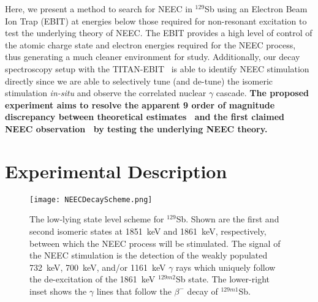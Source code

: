 \documentclass[12pt]{article}
\begin{document}
Here, we present a method to search for NEEC in $^{129}$Sb using an Electron Beam Ion Trap (EBIT) at energies below those required for non-resonant excitation to test the underlying theory of NEEC.  The EBIT provides a high level of control of the atomic charge state and electron energies required for the NEEC process, thus generating a much cleaner environment for study.  Additionally, our decay spectroscopy setup with the TITAN-EBIT~\cite{Lea15} is able to identify NEEC stimulation directly since we are able to selectively tune (and de-tune) the isomeric stimulation {\it in-situ} and observe the correlated nuclear $\gamma$ cascade.  \textbf{The proposed experiment aims to resolve the apparent 9 order of magnitude discrepancy between theoretical estimates~\cite{Pal19} and the first claimed NEEC observation~\cite{Chi18} by testing the underlying NEEC theory.}

\section{Experimental Description}
\begin{figure}[t!]
  \centering
  \texttt{[image: NEECDecayScheme.png]}
  \caption{\label{NEEC}\small The low-lying state level scheme for $^{129}$Sb.  Shown are the first and second isomeric states at 1851~keV and 1861~keV, respectively, between which the NEEC process will be stimulated.  The signal of the NEEC stimulation is the detection of the weakly populated 732~keV, 700~keV, and/or 1161~keV $\gamma$ rays which uniquely follow the de-excitation of the 1861~keV $^{129m2}$Sb state.  The lower-right inset shows the $\gamma$ lines that follow the $\beta^-$ decay of $^{129m1}$Sb.}
\end{figure}
\end{document}
